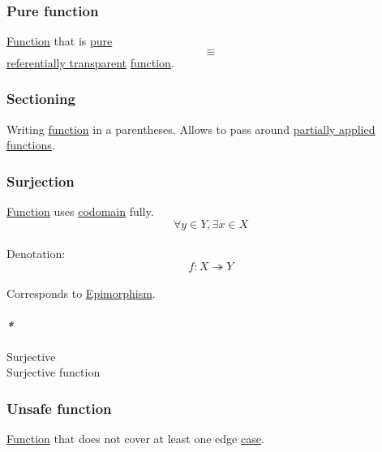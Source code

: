 \documentclass[11pt]{article}
\begin{document}
\subsubsection{\label{orgf4f5f7d}Pure function}
\label{sec:org4ff4295}

\hyperref[orge15bc14]{Function} that is \hyperref[org1bf8e16]{pure} $$ \equiv $$ \hyperref[orgd5ad3f9]{referentially transparent} \hyperref[orge15bc14]{function}.\\

\subsubsection{\label{orge0fc764}Sectioning}
\label{sec:orgccead12}
Writing \hyperref[orge15bc14]{function} in a parentheses. Allows to pass around \hyperref[org23a90a6]{partially applied} \hyperref[orgaa8fb87]{functions}.\\

\subsubsection{\label{org0ca10af}Surjection}
\label{sec:orgdb1dcd5}
\hyperref[orge15bc14]{Function} uses \hyperref[org410079d]{codomain} fully.\\

$$ \forall y \in Y, \exists x \in X $$\\

Denotation:\\
$$ f : X \twoheadrightarrow Y $$\\

Corresponds to \hyperref[orgb5de842]{Epimorphism}.\\

\paragraph{\emph{*}}
\label{sec:org119df67}

\label{org6e4e05d}Surjective\\
\label{orgae6ac39}Surjective function\\

\subsubsection{\label{org0e8736e}Unsafe function}
\label{sec:org2776bf5}
\hyperref[orge15bc14]{Function} that does not cover at least one edge \hyperref[org41d12b6]{case}.\\
\end{document}
